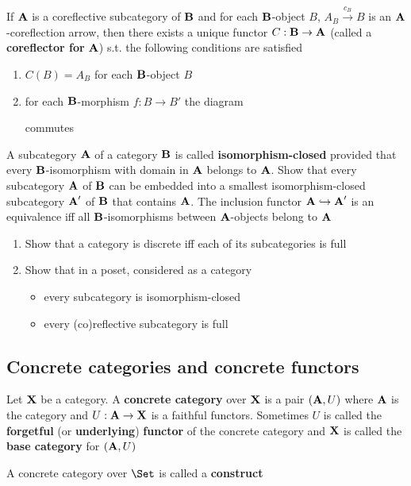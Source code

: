 \documentclass[11pt]{article}
\begin{document}
\begin{proposition}[]
If \(\operatorname{\textbf{A}}\) is a coreflective subcategory of \(\operatorname{\textbf{B}}\) and for each
\(\operatorname{\textbf{B}}\)-object \(B\), \(A_B\xrightarrow{c_B}B\) is an \(\operatorname{\textbf{A}}\)-coreflection
arrow, then there exists a unique functor \(C:\operatorname{\textbf{B}}\to\operatorname{\textbf{A}}\) (called a
\textbf{coreflector for} \(\operatorname{\textbf{A}}\)) s.t. the following conditions are satisfied
\begin{enumerate}
\item \(C(B)=A_B\) for each \(\operatorname{\textbf{B}}\)-object \(B\)
\item for each \(\operatorname{\textbf{B}}\)-morphism \(f:B\to B'\) the diagram
\begin{center}\end{center}
commutes
\end{enumerate}
\end{proposition}

\begin{exercise}
A subcategory \(\operatorname{\textbf{A}}\) of a category \(\operatorname{\textbf{B}}\) is called \textbf{isomorphism-closed}
provided that every \(\operatorname{\textbf{B}}\)-isomorphism with domain in \(\operatorname{\textbf{A}}\) belongs to
\(\operatorname{\textbf{A}}\). Show that every subcategory \(\operatorname{\textbf{A}}\) of \(\operatorname{\textbf{B}}\) can be embedded into
a smallest isomorphism-closed subcategory \(\operatorname{\textbf{A}}'\) of \(\operatorname{\textbf{B}}\) that contains
\(\operatorname{\textbf{A}}\). The inclusion functor \(\operatorname{\textbf{A}}\hookrightarrow\operatorname{\textbf{A}}'\) is an equivalence
iff all \(\operatorname{\textbf{B}}\)-isomorphisms between \(\operatorname{\textbf{A}}\)-objects belong to \(\operatorname{\textbf{A}}\)
\end{exercise}

\begin{exercise}
\begin{enumerate}
\item Show that a category is discrete iff each of its subcategories is full
\item Show that in a poset, considered as a category
\begin{itemize}
\item every subcategory is isomorphism-closed
\item every (co)reflective subcategory is full
\end{itemize}
\end{enumerate}
\end{exercise}
\subsection{Concrete categories and concrete functors}
\label{sec:orgefbffb3}
\begin{definition}[]
Let \(\operatorname{\textbf{X}}\) be a category. A \textbf{concrete category} over \(\operatorname{\textbf{X}}\) is a pair
\((\operatorname{\textbf{A}},U)\) where \(\operatorname{\textbf{A}}\) is the category and \(U:\operatorname{\textbf{A}}\to\operatorname{\textbf{X}}\) is a faithful
functors. Sometimes \(U\) is called the \textbf{forgetful} (or \textbf{underlying}) \textbf{functor} of
the concrete category and \(\operatorname{\textbf{X}}\) is called the \textbf{base category} for \((\operatorname{\textbf{A}},U)\)

A concrete category over \(\Set\) is called a \textbf{construct}
\end{definition}
\end{document}
